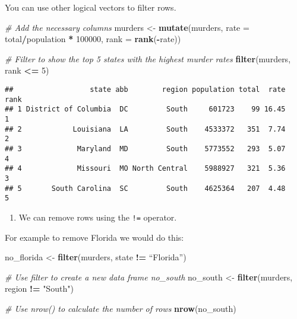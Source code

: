 \documentclass[]{article}
\newenvironment{Shaded}{\begin{snugshade}}{\end{snugshade}}
\newcommand{\CommentTok}[1]{\textcolor[rgb]{0.56,0.35,0.01}{\textit{#1}}}
\newcommand{\DataTypeTok}[1]{\textcolor[rgb]{0.13,0.29,0.53}{#1}}
\newcommand{\DecValTok}[1]{\textcolor[rgb]{0.00,0.00,0.81}{#1}}
\newcommand{\KeywordTok}[1]{\textcolor[rgb]{0.13,0.29,0.53}{\textbf{#1}}}
\newcommand{\NormalTok}[1]{#1}
\newcommand{\OperatorTok}[1]{\textcolor[rgb]{0.81,0.36,0.00}{\textbf{#1}}}
\newcommand{\StringTok}[1]{\textcolor[rgb]{0.31,0.60,0.02}{#1}}
\providecommand{\tightlist}{%
  \setlength{\itemsep}{0pt}\setlength{\parskip}{0pt}}
\begin{document}
You can use other logical vectors to filter rows.

\begin{Shaded}
\begin{Highlighting}[]
\CommentTok{# Add the necessary columns}
\NormalTok{murders <-}\StringTok{ }\KeywordTok{mutate}\NormalTok{(murders, }\DataTypeTok{rate =}\NormalTok{ total}\OperatorTok{/}\NormalTok{population }\OperatorTok{*}\StringTok{ }\DecValTok{100000}\NormalTok{, }\DataTypeTok{rank =} \KeywordTok{rank}\NormalTok{(}\OperatorTok{-}\NormalTok{rate))}

\CommentTok{# Filter to show the top 5 states with the highest murder rates}
\KeywordTok{filter}\NormalTok{(murders, rank }\OperatorTok{<=}\StringTok{ }\DecValTok{5}\NormalTok{)}
\end{Highlighting}
\end{Shaded}

\begin{verbatim}
##                  state abb        region population total  rate rank
## 1 District of Columbia  DC         South     601723    99 16.45    1
## 2            Louisiana  LA         South    4533372   351  7.74    2
## 3             Maryland  MD         South    5773552   293  5.07    4
## 4             Missouri  MO North Central    5988927   321  5.36    3
## 5       South Carolina  SC         South    4625364   207  4.48    5
\end{verbatim}

\begin{enumerate}
\def\labelenumi{\arabic{enumi}.}
\setcounter{enumi}{4}
\tightlist
\item
  We can remove rows using the \texttt{!=} operator.
\end{enumerate}

For example to remove Florida we would do this:

\begin{Shaded}
\begin{Highlighting}[]
\NormalTok{no_florida <-}\StringTok{ }\KeywordTok{filter}\NormalTok{(murders, state }\OperatorTok{!=}\StringTok{ }\NormalTok{“Florida”)}
\end{Highlighting}
\end{Shaded}

\begin{Shaded}
\begin{Highlighting}[]
\CommentTok{# Use filter to create a new data frame no_south}
\NormalTok{no_south <-}\StringTok{ }\KeywordTok{filter}\NormalTok{(murders, region }\OperatorTok{!=}\StringTok{ "South"}\NormalTok{)}

\CommentTok{# Use nrow() to calculate the number of rows}
\KeywordTok{nrow}\NormalTok{(no_south)}
\end{Highlighting}
\end{Shaded}
\end{document}
